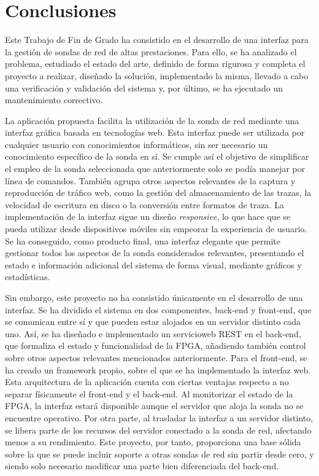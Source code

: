 \chapter{Conclusiones\label{cap:conclusiones}}

Este Trabajo de Fin de Grado ha consistido en el desarrollo de una interfaz para la gestión de sondas de red de altas prestaciones.
Para ello, se ha analizado el problema, estudiado el estado del arte, definido de forma rigurosa y completa el proyecto a realizar, diseñado la solución, implementado la misma, llevado a cabo una verificación y validación del sistema y, por último, se ha ejecutado un mantenimiento correctivo.

La aplicación propuesta facilita la utilización de la sonda de red mediante una interfaz gráfica basada en tecnologías web.
Esta interfaz puede ser utilizada por cualquier usuario con conocimientos informáticos, sin ser necesario un conocimiento específico de la sonda en sí.
Se cumple así el objetivo de simplificar el empleo de la sonda seleccionada que anteriormente solo se podía manejar por línea de comandos.
También agrupa otros aspectos relevantes de la captura y reproducción de tráfico web, como la gestión del almacenamiento de las \glspl{traza}, la velocidad de escritura en disco o la conversión entre formatos de \gls{traza}.
La implementación de la interfaz sigue un diseño \textit{responsive}, lo que hace que se pueda utilizar desde dispositivos móviles sin empeorar la experiencia de usuario.
Se ha conseguido, como producto final, una interfaz elegante que permite gestionar todos los aspectos de la sonda considerados relevantes, presentando el estado e información adicional del sistema de forma visual, mediante gráficos y estadísticas.

Sin embargo, este proyecto no ha consistido únicamente en el desarrollo de una interfaz.
Se ha dividido el sistema en dos componentes, \gls{back-end} y \gls{front-end}, que se comunican entre sí y que pueden estar alojados en un servidor distinto cada uno.
Así, se ha diseñado e implementado un \gls{servicioweb} \gls{REST} en el \gls{back-end}, que formaliza el estado y funcionalidad de la \gls{FPGA}, añadiendo también control sobre otros aspectos relevantes mencionados anteriormente.
Para el \gls{front-end}, se ha creado un \gls{framework} propio, sobre el que se ha implementado la interfaz web.
Esta arquitectura de la aplicación cuenta con ciertas ventajas respecto a no separar físicamente el \gls{front-end} y el \gls{back-end}.
Al monitorizar el estado de la \gls{FPGA}, la interfaz estará disponible aunque el servidor que aloja la sonda no se encuentre operativo.
Por otra parte, al trasladar la interfaz a un servidor distinto, se libera parte de los recursos del servidor conectado a la sonda de red, afectando menos a su rendimiento.
Este proyecto, por tanto, proporciona una base sólida sobre la que se puede incluir soporte a otras sondas de red sin partir desde cero, y siendo solo necesario modificar una parte bien diferenciada del \gls{back-end}.


